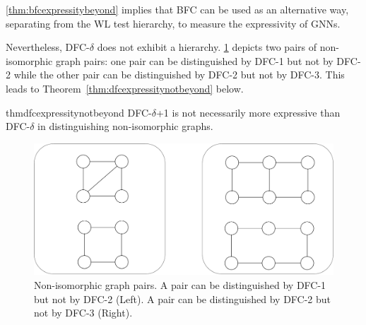 \cref{thm:bfcexpressitybeyond} implies that BFC can be used as an alternative way, separating from the WL test hierarchy, to measure the expressivity of GNNs. 

Nevertheless, DFC-$\delta$ does not exhibit a hierarchy. \cref{fig:dfc_expressity_delta} 
depicts two pairs of non-isomorphic graph pairs: one pair can be distinguished by DFC-1 but not by DFC-2 while the other pair can be distinguished by DFC-2 but not by DFC-3. This leads to Theorem~\ref{thm:dfcexpressitynotbeyond} below. 

\begin{restatable}[]{thm}{dfcexpressitynotbeyond}
\label{thm:dfcexpressitynotbeyond}
DFC-$\delta$+1 is not necessarily more expressive than DFC-$\delta$ in distinguishing non-isomorphic graphs. 
\end{restatable}

 

\begin{figure}[ht]
\centering
\includegraphics[clip,width=0.65\columnwidth]{figures/dfc_expressity_delta_1_2_new.pdf}
\caption{Non-isomorphic graph pairs. A pair can be distinguished by DFC-1 but not by DFC-2 (Left). A pair can be distinguished by DFC-2 but not by DFC-3 (Right).} 
\label{fig:dfc_expressity_delta}
\end{figure}




